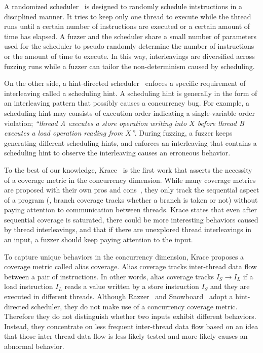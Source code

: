 A randomized scheduler~\cite{ski, pctalgorithm, krace, sparsernr} is
designed to randomly schedule intstructions in a disciplined
manner. It tries to keep only one thread to execute while the thread
runs until a certain number of instructions are executed or a certain
amount of time has elapsed.
%
A fuzzer and the scheduler share a small number of parameters used for
the scheduler to pseudo-randomly determine the number of instructions
or the amount of time to execute.
%
In this way, interleavings are diversified across fuzzing runs while a
fuzzer can tailor the non-determinism caused by scheduling.

On the other side, a hint-directed scheduler~\cite{razzer, snowboard}
enfoces a specific requirement of interleaving called a scheduling
hint.
%
A scheduling hint is generally in the form of an interleaving pattern
that possibly causes a concurrency bug. For example, a scheduling hint
may consists of execution order indicating a single-variable order
violation; \textit{``thread A executes a store operation writing into
  $X$ before thread B executes a load operation reading from $X$''}.
%
During fuzzing, a fuzzer keeps generating different scheduling hints,
and enforces an interleaving that contains a scheduling hint to
observe the interleaving causes an erroneous behavior.


%
%
To the best of our knowledge, Krace~\cite{krace} is the first work
that asserts the necessity of a coverage metric in the concurrency
dimension.
%
While many coverage metrics are proposed with their own pros and
cons~\cite{wang2019sensitive}, they only track the sequential aspect
of a program (\eg, branch coverage tracks whether a branch is taken or
not) without paying attention to communication between threads.
%
Krace states that even after sequential coverage is saturated, there
could be more interesting behaviors caused by thread interleavings,
and that if there are unexplored thread interleavings in an input, a
fuzzer should keep paying attention to the input.

To capture unique behaviors in the concurrency dimension, Krace
proposes a coverage metric called alias coverage.
%
Alias coverage tracks inter-thread data flow between a pair of
instructions. In other words, alias coverage tracks
\texttt{$I_S \rightarrow I_L$} if a load instruction \texttt{$I_L$}
reads a value written by a store instruction \texttt{$I_S$} and they
are executed in different threads.
%
%
%
Although Razzer~\cite{razzer} and Snowboard~\cite{snowboard} adopt a
hint-directed scheduler, they do not make use of a concurrency
coverage metric. Therefore they do not distinguish whether two inputs
exhibit different behaviors. Instead, they concentrate on less
frequent inter-thread data flow based on an idea that those
inter-thread data flow is less likely tested and more likely causes an
abnormal behavior.


